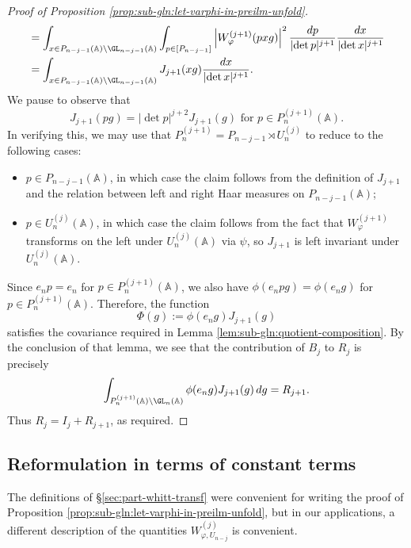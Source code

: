 \begin{proof}[Proof of Proposition \ref{prop:sub-gln:let-varphi-in-preilm-unfold}]
\begin{align*}
    &=
      \int_{x \in P_{n-j-1}(\mathbb{A}) \backslash \GL_{n-j-1}(\mathbb{A})}
      \int_{p \in[P_{n - j - 1}]}
      \left\lvert W_{\varphi}^{(j+1)}(p x g) \right\rvert^2
      \frac{d p}{\lvert \det p \rvert^{j+1}}
      \frac{d x}{\lvert \det x \rvert^{j+1}}
    \\
    &=
      \int_{x \in P_{n-j-1}(\mathbb{A}) \backslash \GL_{n-j-1}(\mathbb{A})}
      J_{j + 1}(x g)
      \frac{d x}{\lvert \det x \rvert^{j+1}}.
  \end{align*}
  We pause to observe that
  \begin{equation*}
    J_{j+1}(p g)  =  \lvert \det p \rvert^{j + 2} J_{j+1}(g) \text{ for } p \in P_n^{(j + 1)}(\mathbb{A}).
  \end{equation*}
  In verifying this, we may use that $P_n^{(j + 1)} = P_{n - j - 1} \rtimes U_n^{(j)}$ to reduce to the following cases:
  \begin{itemize}
  \item $p \in P_{n - j - 1}(\mathbb{A})$, in which case the claim follows from the definition of $J_{j + 1}$ and the relation between left and right Haar measures on $P_{n - j - 1}(\mathbb{A})$;
  \item $p \in U_n^{(j)}(\mathbb{A})$, in which case the claim follows from the fact that $W_\varphi^{(j + 1)}$ transforms on the left under $U_n^{(j)}(\mathbb{A})$ via $\psi$, so $J_{j + 1}$ is left invariant under $U_n^{(j)}(\mathbb{A})$.
  \end{itemize}
  Since $e_n p = e_n$ for $p \in P_n^{(j + 1)}(\mathbb{A})$, we also have $\phi(e_n p g) = \phi(e_n g)$ for $p \in P_n^{(j + 1)}(\mathbb{A})$.  Therefore, the function
  \[
    \Phi(g) := \phi(e_n g) J_{j+1}(g)
  \]
  satisfies the covariance required in Lemma \ref{lem:sub-gln:quotient-composition}.  By the conclusion of that lemma, we see that the contribution of $B_j$ to $R_j$ is precisely
  \[
    \int_{P_n^{(j + 1)}(\mathbb{A}) \backslash \GL_n(\mathbb{A})}
    \phi(e_n g) J_{j+1}(g)\, d g
    =
    R_{j+1}.
  \]
  Thus $R_j = I_j + R_{j+1}$, as required.
\end{proof}

\subsection{Reformulation in terms of constant terms}\label{sec:reform-terms-const-1}
The definitions of \S\ref{sec:part-whitt-transf} were convenient for writing the proof of Proposition \ref{prop:sub-gln:let-varphi-in-preilm-unfold}, but in our applications, a different description of the quantities $W_{\varphi,U_{n-j}}^{(j)}$ is convenient.

